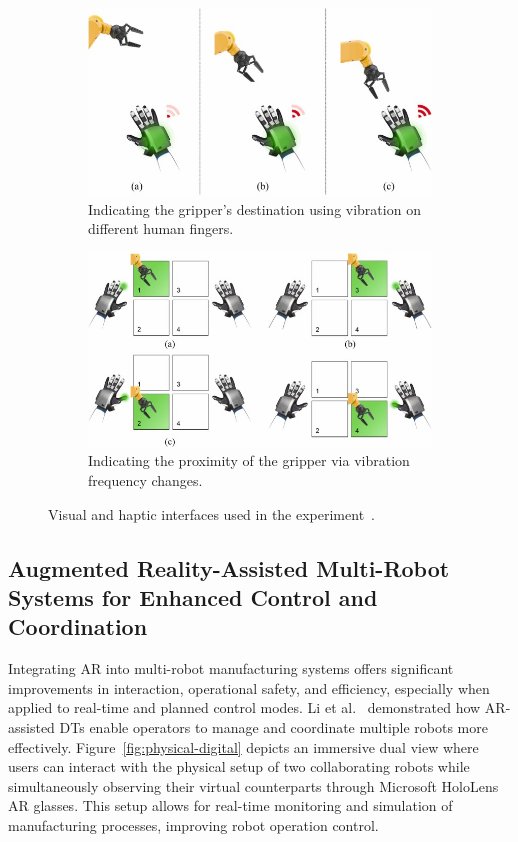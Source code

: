 \begin{figure}[htp]
    \centering
    \begin{subfigure}{.49\textwidth}
        \centering
        \includegraphics[width=0.9\linewidth]{figs/haptic-cues.jpg}
        \caption{Indicating the gripper’s destination using vibration on different human fingers.}
        \label{fig:sfig1}
    \end{subfigure}%
    \begin{subfigure}{.49\textwidth}
        \centering
        \includegraphics[width=0.9\linewidth]{figs/visual-cues.jpg}
        \caption{Indicating the proximity of the gripper via vibration frequency changes.}
        \label{fig:sfig2}
    \end{subfigure}
    \caption{Visual and haptic interfaces used in the experiment~\cite{CHU2023313}.}
    \label{fig:haptic-visual-cues}
\end{figure}

\subsection{Augmented Reality-Assisted Multi-Robot Systems for Enhanced Control and Coordination}
Integrating \ac{AR} into multi-robot manufacturing systems offers significant improvements in interaction, operational safety, and efficiency, especially when applied to real-time and planned control modes. Li et al.~\cite{LI2022102321} demonstrated how \ac{AR}-assisted \ac{DTs} enable operators to manage and coordinate multiple robots more effectively.
Figure~\ref{fig:physical-digital} depicts an immersive dual view where users can interact with the physical setup of two collaborating robots while simultaneously observing their virtual counterparts through Microsoft HoloLens \ac{AR} glasses. This setup allows for real-time monitoring and simulation of manufacturing processes, improving robot operation control.

